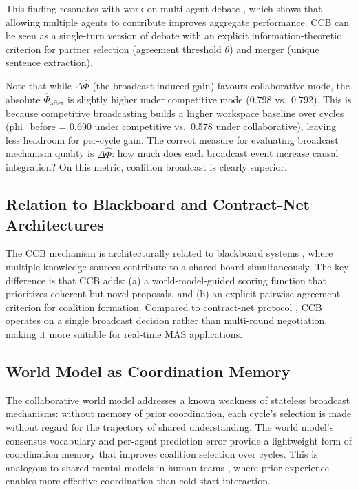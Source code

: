 \documentclass[11pt]{article}
\theoremstyle{definition}
\begin{document}
This finding resonates with work on multi-agent debate \citep{du2023,chan2023}, which shows
that allowing multiple agents to contribute improves aggregate performance. CCB can be seen
as a single-turn version of debate with an explicit information-theoretic criterion for
partner selection (agreement threshold $\theta$) and merger (unique sentence extraction).

Note that while $\Delta\hat{\Phi}$ (the broadcast-induced gain) favours collaborative mode,
the absolute $\hat{\Phi}_{\text{after}}$ is slightly higher under competitive mode ($0.798$
vs.\ $0.792$). This is because competitive broadcasting builds a higher workspace baseline
over cycles (phi\_before = 0.690 under competitive vs.\ 0.578 under collaborative), leaving
less headroom for per-cycle gain. The correct measure for evaluating broadcast mechanism
quality is $\Delta\hat{\Phi}$: how much does each broadcast event increase causal integration?
On this metric, coalition broadcast is clearly superior.

\subsection{Relation to Blackboard and Contract-Net Architectures}

The CCB mechanism is architecturally related to blackboard systems \citep{nii1986}, where
multiple knowledge sources contribute to a shared board simultaneously. The key difference
is that CCB adds: (a) a world-model-guided scoring function that prioritizes coherent-but-novel
proposals, and (b) an explicit pairwise agreement criterion for coalition formation. Compared
to contract-net protocol \citep{smith1980}, CCB operates on a single broadcast decision
rather than multi-round negotiation, making it more suitable for real-time MAS applications.

\subsection{World Model as Coordination Memory}

The collaborative world model addresses a known weakness of stateless broadcast mechanisms:
without memory of prior coordination, each cycle's selection is made without regard for
the trajectory of shared understanding. The world model's consensus vocabulary and per-agent
prediction error provide a lightweight form of coordination memory that improves coalition
selection over cycles. This is analogous to shared mental models in human teams \citep{cannon1993},
where prior experience enables more effective coordination than cold-start interaction.
\end{document}
